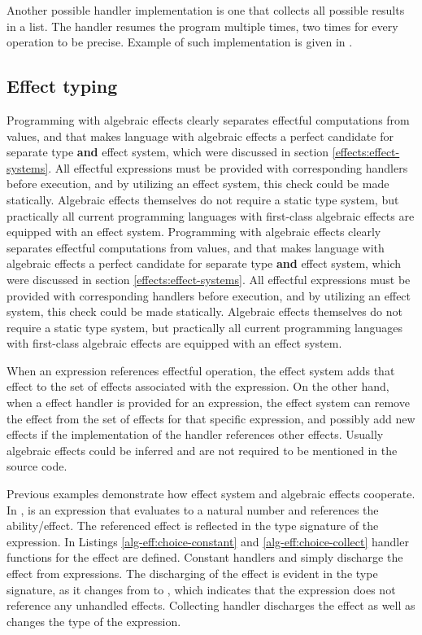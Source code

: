 Another possible handler implementation is one that collects all possible results in a list.
The handler resumes the program multiple times, two times for every  operation to be precise. Example of such implementation is given in .




\subsection{Effect typing}
Programming with algebraic effects clearly separates effectful computations from values, and that makes language with algebraic effects a perfect candidate for separate type \textbf{and} effect system, which were discussed in section \ref{effects:effect-systems}. All effectful expressions must be provided with corresponding handlers before execution, and by utilizing an effect system, this check could be made statically. Algebraic effects themselves do not require a static type system, but practically all current programming languages with first-class algebraic effects are equipped with an effect system.
Programming with algebraic effects clearly separates effectful computations from values, and that makes language with algebraic effects a perfect candidate for separate type \textbf{and} effect system, which were discussed in section \ref{effects:effect-systems}. All effectful expressions must be provided with corresponding handlers before execution, and by utilizing an effect system, this check could be made statically. Algebraic effects themselves do not require a static type system, but practically all current programming languages with first-class algebraic effects are equipped with an effect system.

When an expression references effectful operation, the effect system adds that effect to the set of effects associated with the expression. On the other hand, when a effect handler is provided for an expression, the effect system can remove the effect from the set of effects for that specific expression, and possibly add new effects if the implementation of the handler references other effects. Usually algebraic effects could be inferred and are not required to be mentioned in the source code.

Previous examples demonstrate how effect system and algebraic effects cooperate. In ,  is an expression that evaluates to a natural number and references the  ability/effect. The referenced effect is reflected in the type signature of the expression. In Listings \ref{alg-eff:choice-constant} and \ref{alg-eff:choice-collect} handler functions for the  effect are defined. Constant handlers  and  simply discharge the effect from expressions. The discharging of the effect is evident in the type signature, as it changes from  to , which indicates that the expression does not reference any unhandled effects. Collecting handler  discharges the effect as well as changes the type of the expression.

